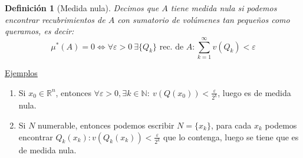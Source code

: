 \documentclass[10pt,a4paper,openright]{book}
\theoremstyle{break}
\newtheorem*{defi}{Definición}
\begin{document}
\begin{defi}[Medida nula]
Decimos que $A$ tiene medida nula si podemos encontrar recubrimientos de $A$ con sumatorio de volúmenes tan pequeños como queramos, es decir:
$$\mu^{*}\left( A \right) = 0 \Leftrightarrow \forall \varepsilon > 0 \ \exists \{Q_k\} \text{ rec. de } A: \sum_{k=1}^{\infty} v\left( Q_k \right) < \varepsilon $$  
\end{defi}

\underline{Ejemplos}
	\begin{enumerate}
       \item Si $x_0 \in \mathbb{R}^{n}$, entonces $\forall \varepsilon > 0, \exists k \in \mathbb N: \ v\left( Q\left( x_0 \right)  \right) < \frac{\varepsilon}{2^{k}}$, luego es de medida nula.
       \item Si $N$ numerable, entonces podemos escribir $N = \{x_k\}$, para cada $x_k$ podemos encontrar $Q_k\left( x_k \right): v\left( Q_k\left( x_k \right)  \right) < \frac{\varepsilon}{2^{k}}$ que lo contenga, luego se tiene que es de medida nula.
    \end{enumerate}
    
\end{document}
